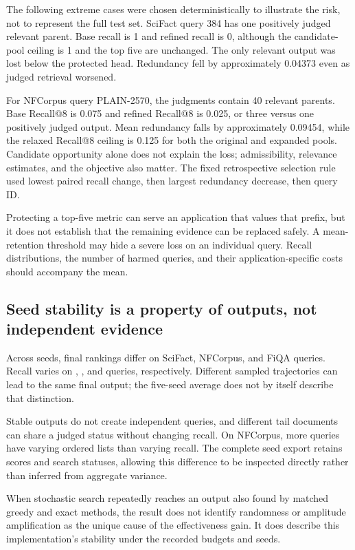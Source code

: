 The following extreme cases were chosen deterministically to illustrate the risk, not to represent the full test set. SciFact query 384 has one positively judged relevant parent. Base recall is 1 and refined recall is 0, although the candidate-pool ceiling is 1 and the top five are unchanged. The only relevant output was lost below the protected head. Redundancy fell by approximately 0.04373 even as judged retrieval worsened.

For NFCorpus query PLAIN-2570, the judgments contain 40 relevant parents. Base Recall@8 is 0.075 and refined Recall@8 is 0.025, or three versus one positively judged output. Mean redundancy falls by approximately 0.09454, while the relaxed Recall@8 ceiling is 0.125 for both the original and expanded pools. Candidate opportunity alone does not explain the loss; admissibility, relevance estimates, and the objective also matter. The fixed retrospective selection rule used lowest paired recall change, then largest redundancy decrease, then query ID.

Protecting a top-five metric can serve an application that values that prefix, but it does not establish that the remaining evidence can be replaced safely. A mean-retention threshold may hide a severe loss on an individual query. Recall distributions, the number of harmed queries, and their application-specific costs should accompany the mean.

\subsection{Seed stability is a property of outputs, not independent evidence}
Across seeds, final rankings differ on \scifactSeedVary{} SciFact, \nfcorpusSeedVary{} NFCorpus, and \fiqaSeedVary{} FiQA queries. Recall varies on \scifactSeedRecall{}, \nfcorpusSeedRecall{}, and \fiqaSeedRecall{} queries, respectively. Different sampled trajectories can lead to the same final output; the five-seed average does not by itself describe that distinction.

Stable outputs do not create independent queries, and different tail documents can share a judged status without changing recall. On NFCorpus, more queries have varying ordered lists than varying recall. The complete seed export retains scores and search statuses, allowing this difference to be inspected directly rather than inferred from aggregate variance.

When stochastic search repeatedly reaches an output also found by matched greedy and exact methods, the result does not identify randomness or amplitude amplification as the unique cause of the effectiveness gain. It does describe this implementation's stability under the recorded budgets and seeds.

